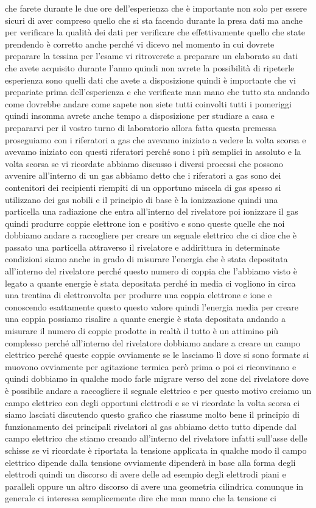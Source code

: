 che farete durante le due ore dell'esperienza che è importante non solo per essere sicuri di aver compreso quello che si sta facendo durante la presa dati ma anche per verificare la qualità dei dati per verificare che effettivamente quello che state prendendo è corretto anche perché vi dicevo nel momento in cui dovrete preparare la tessina per l'esame vi ritroverete a preparare un elaborato su dati che avete acquisito durante l'anno quindi non avrete la possibilità di ripeterle esperienza sono quelli dati che avete a disposizione quindi è importante che vi prepariate prima dell'esperienza e che verificate man mano che tutto sta andando come dovrebbe andare come sapete non siete tutti coinvolti tutti i pomeriggi quindi insomma avrete anche tempo a disposizione per studiare a casa e prepararvi per il vostro turno di laboratorio allora fatta questa premessa proseguiamo con i riferatori a gas che avevamo iniziato a vedere la volta scorsa e avevamo iniziato con questi riferatori perché sono i più semplici in assoluto e la volta scorsa se vi ricordate abbiamo discusso i diversi processi che possono avvenire all'interno di un gas abbiamo detto che i riferatori a gas sono dei contenitori dei recipienti riempiti di un opportuno miscela di gas spesso si utilizzano dei gas nobili e il principio di base è la ionizzazione quindi una particella una radiazione che entra all'interno del rivelatore poi ionizzare il gas quindi produrre coppie elettrone ion e positivo e sono queste quelle che noi dobbiamo andare a raccogliere per creare un segnale elettrico che ci dice che è passato una particella attraverso il rivelatore e addirittura in determinate condizioni siamo anche in grado di misurare l'energia che è stata depositata all'interno del rivelatore perché questo numero di coppia che l'abbiamo visto è legato a quante energie è stata depositata perché in media ci vogliono in circa una trentina di elettronvolta per produrre una coppia elettrone e ione e conoscendo esattamente questo questo valore quindi l'energia media per creare una coppia possiamo risalire a quante energie è stata depositata andando a misurare il numero di coppie prodotte in realtà il tutto è un attimino più complesso perché all'interno del rivelatore dobbiamo andare a creare un campo elettrico perché queste coppie ovviamente se le lasciamo lì dove si sono formate si muovono ovviamente per agitazione termica però prima o poi ci riconvinano e quindi dobbiamo in qualche modo farle migrare verso del zone del rivelatore dove è possibile andare a raccogliere il segnale elettrico e per questo motivo creiamo un campo elettrico con degli opportuni elettrodi e se vi ricordate la volta scorsa ci siamo lasciati discutendo questo grafico che riassume molto bene il principio di funzionamento dei principali rivelatori al gas abbiamo detto tutto dipende dal campo elettrico che stiamo creando all'interno del rivelatore infatti sull'asse delle schisse se vi ricordate è riportata la tensione applicata in qualche modo il campo elettrico dipende dalla tensione ovviamente dipenderà in base alla forma degli elettrodi quindi un discorso di avere delle ad esempio degli elettrodi piani e paralleli oppure un altro discorso di avere una geometria cilindrica comunque in generale ci interessa semplicemente dire che man mano che la tensione ci 